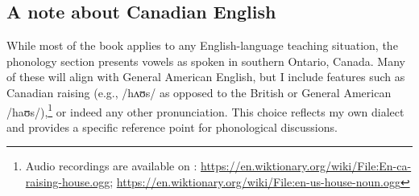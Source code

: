 \subsection*{A note about Canadian English}

While most of the book applies to any English-language teaching situation, the phonology section presents vowels as spoken in southern Ontario, Canada. Many of these will align with General American English, but I include features such as Canadian raising (e.g., /hʌʊs/ as opposed to the British or General American /haʊs/),\footnote{Audio recordings are available on : \url{https://en.wiktionary.org/wiki/File:En-ca-raising-house.ogg}; \url{https://en.wiktionary.org/wiki/File:en-us-house-noun.ogg}} or indeed any other pronunciation. This choice reflects my own dialect and provides a specific reference point for phonological discussions.
